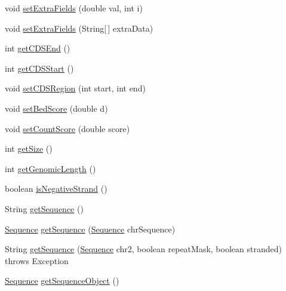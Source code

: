 \begin{DoxyCompactItemize}
\item 
void \hyperlink{classumms_1_1core_1_1annotation_1_1_gene_a457730d49c8cdcad369607d739886138}{set\+Extra\+Fields} (double val, int i)
\item 
void \hyperlink{classumms_1_1core_1_1annotation_1_1_gene_a6ffa299443674cbedd905df9c4fcf08e}{set\+Extra\+Fields} (String\mbox{[}$\,$\mbox{]} extra\+Data)
\item 
int \hyperlink{classumms_1_1core_1_1annotation_1_1_gene_a13e77e99c8170151fc7ab481f7e33318}{get\+C\+D\+S\+End} ()
\item 
int \hyperlink{classumms_1_1core_1_1annotation_1_1_gene_aefe341def25928fca0a33427ed3e1bee}{get\+C\+D\+S\+Start} ()
\item 
void \hyperlink{classumms_1_1core_1_1annotation_1_1_gene_a5a3c5a6eddaf623e77ca3966feba6e3e}{set\+C\+D\+S\+Region} (int start, int end)
\item 
void \hyperlink{classumms_1_1core_1_1annotation_1_1_gene_a9f1ad94878c6e09f06a6a60e0797b64d}{set\+Bed\+Score} (double d)
\item 
void \hyperlink{classumms_1_1core_1_1annotation_1_1_gene_a5f40ece5a87771c6fc89d79f56ac45e4}{set\+Count\+Score} (double score)
\item 
int \hyperlink{classumms_1_1core_1_1annotation_1_1_gene_a9e791756126fb65d791fe6c3620535b8}{get\+Size} ()
\item 
int \hyperlink{classumms_1_1core_1_1annotation_1_1_gene_a0becc72afe78ac5896c56262ce9f93ae}{get\+Genomic\+Length} ()
\item 
boolean \hyperlink{classumms_1_1core_1_1annotation_1_1_gene_a64f4da8582b66df16ffdf4f10d189e06}{is\+Negative\+Strand} ()
\item 
String \hyperlink{classumms_1_1core_1_1annotation_1_1_gene_a52a5ba66770bdae96fe3d634c5749281}{get\+Sequence} ()
\item 
\hyperlink{classbroad_1_1core_1_1sequence_1_1_sequence}{Sequence} \hyperlink{classumms_1_1core_1_1annotation_1_1_gene_a5a10b7670b65de27206e27e2d283edc4}{get\+Sequence} (\hyperlink{classbroad_1_1core_1_1sequence_1_1_sequence}{Sequence} chr\+Sequence)
\item 
String \hyperlink{classumms_1_1core_1_1annotation_1_1_gene_acfe5f2d2370e21b2fdbb48964103747b}{get\+Sequence} (\hyperlink{classbroad_1_1core_1_1sequence_1_1_sequence}{Sequence} chr2, boolean repeat\+Mask, boolean stranded)  throws Exception 
\item 
\hyperlink{classbroad_1_1core_1_1sequence_1_1_sequence}{Sequence} \hyperlink{classumms_1_1core_1_1annotation_1_1_gene_a8a83f1fd0ee98494e18c36476155cec0}{get\+Sequence\+Object} ()

\end{DoxyCompactItemize}
